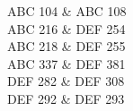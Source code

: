 
ABC 104 \& ABC 108\\
ABC 216 \& DEF 254\\
ABC 218 \& DEF 255\\
ABC 337 \& DEF 381\\
DEF 282 \& DEF 308\\
DEF 292 \& DEF 293\\
